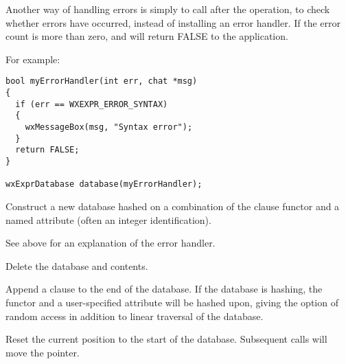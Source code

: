 Another way of handling errors is simply to call  after
the operation, to check whether errors have occurred, instead of installing an error handler.
If the error count is more than zero,  and
\rtfsp{} will return FALSE to
the application.

For example:

\begin{verbatim}
bool myErrorHandler(int err, chat *msg)
{
  if (err == WXEXPR_ERROR_SYNTAX)
  {
    wxMessageBox(msg, "Syntax error");
  }
  return FALSE;
}

wxExprDatabase database(myErrorHandler);
\end{verbatim}


Construct a new database hashed on a combination of the clause functor and
a named attribute (often an integer identification).

See above for an explanation of the error handler.



Delete the database and contents.

\label{wxexprdatabaseappend}


Append a clause to the end of the database. If the database is hashing,
the functor and a user-specified attribute will be hashed upon, giving the
option of random access in addition to linear traversal of the database.

\label{wxexprdatabasebeginfind}


Reset the current position to the start of the database. Subsequent
\rtfsp{} calls will move the pointer.

\label{wxexprdatabasecleardatabase}


